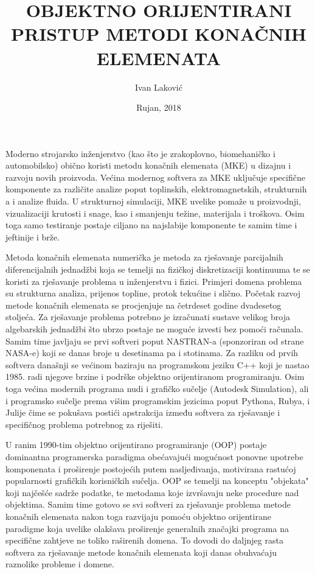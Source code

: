 \documentclass[a4paper,twoside,12pt]{memoir} %
\title{OBJEKTNO ORIJENTIRANI PRISTUP METODI KONAČNIH ELEMENATA}
\author{Ivan Laković}
\date{Rujan, 2018}  %
\begin{document}
\frontmatter


\begin{intro}
Moderno strojarsko inženjerstvo (kao što je zrakoplovno, biomehaničko i automobilsko) obično koristi metodu konačnih elemenata (MKE) u dizajnu i razvoju novih proizvoda. Većina modernog softvera za MKE uključuje specifične komponente za različite analize poput toplinskih, elektromagnetskih, strukturnih a i analize fluida. U strukturnoj simulaciji, MKE uvelike pomaže u proizvodnji, vizualizaciji krutosti i snage, kao i smanjenju težine, materijala i troškova. Osim toga samo testiranje postaje ciljano na najslabije komponente te samim time i jeftinije i brže. \cite{wiki_fem_18} \par

Metoda konačnih elemenata numerička je metoda za rješavanje parcijalnih diferencijalnih jednadžbi koja se temelji na fizičkoj diskretizaciji kontinuuma te se koristi za rješavanje problema u inženjerstvu i fizici. Primjeri domena problema su strukturna analiza, prijenos topline, protok tekućine i slično. Početak razvoj metode konačnih elemenata se procjenjuje na četrdeset godine dvadesetog stoljeća. Za rješavanje problema potrebno je izračunati sustave velikog broja algebarskih jednadžbi što ubrzo postaje ne moguće izvesti bez pomoći računala. Samim time javljaju se prvi softveri poput NASTRAN-a (sponzoriran od strane NASA-e) koji se danas broje u desetinama pa i stotinama. Za razliku od prvih softvera današnji se većinom baziraju na programskom jeziku C++ koji je nastao 1985. radi njegove brzine i podrške objektno orijentiranom programiranju. Osim toga većina modernih programa nudi i grafičko sučelje (Autodesk Simulation), ali i programsko sučelje prema višim programskim jezicima poput Pythona, Rubya, i Julije čime se pokušava postići apstrakcija između softvera za rješavanje i specifičnog problema potrebnog za riješiti. \cite{wiki_list_of_fem_software} \par

U ranim 1990-tim objektno orijentirano programiranje (OOP) postaje dominantna programerska paradigma obećavajući mogućnost ponovne upotrebe komponenata i proširenje postojećih putem nasljeđivanja, motivirana rastućoj popularnosti grafičkih korisničkih sučelja. OOP se temelji na konceptu "objekata" koji najčešće sadrže podatke, te metodama koje izvršavaju neke procedure nad objektima. Samim time gotovo se svi softveri za rješavanje problema metode konačnih elemenata nakon toga razvijaju pomoću objektno orijentirane paradigme koja uvelike olakšava proširenje generalnih značajki programa na specifične zahtjeve ne toliko raširenih domena. To dovodi do daljnjeg rasta softvera za rješavanje metode konačnih elemenata koji danas obuhvaćaju raznolike probleme i domene. \par


\end{intro}
\end{document}
